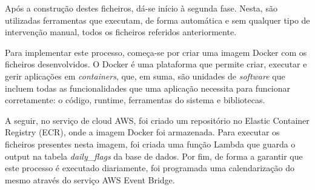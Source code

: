 


Após a construção destes ficheiros, dá-se início à segunda fase. Nesta, são utilizadas ferramentas que executam, de forma automática e sem qualquer tipo de intervenção manual, todos os ficheiros referidos anteriormente.

Para implementar este processo, começa-se por criar uma imagem Docker com os ficheiros desenvolvidos. O Docker é uma plataforma que permite criar, executar e gerir aplicações em \textit{containers}, que, em suma, são unidades de \textit{software} que incluem todas as funcionalidades que uma aplicação necessita para funcionar corretamente: o código, runtime, ferramentas do sistema e bibliotecas.

A seguir, no serviço de cloud AWS, foi criado um repositório no Elastic Container Registry (ECR), onde a imagem Docker foi armazenada. Para executar os ficheiros presentes nesta imagem, foi criada uma função Lambda que guarda o output na tabela \textit{daily\_flags} da base de dados. Por fim, de forma a garantir que este processo é executado diariamente, foi programada uma calendarização do mesmo através do serviço AWS Event Bridge. 


































